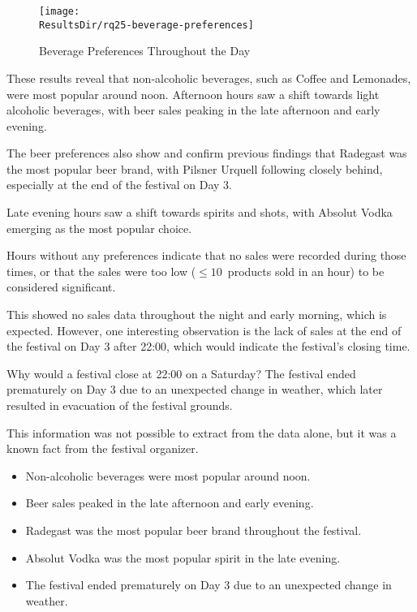 \begin{figure}[H]
	\centering
	\texttt{[image: \\ResultsDir/rq25-beverage-preferences]}
	\caption{Beverage Preferences Throughout the Day}
	\label{fig:beverage-preferences}
	\source
\end{figure}

These results reveal that non-alcoholic beverages, such as Coffee and Lemonades, were most popular around noon.
Afternoon hours saw a shift towards light alcoholic beverages, with beer sales peaking in the late afternoon and early evening.

The beer preferences also show and confirm previous findings that Radegast was the most popular beer brand, with Pilsner Urquell following closely behind, especially at the end of the festival on Day 3.

Late evening hours saw a shift towards spirits and shots, with Absolut Vodka emerging as the most popular choice.

Hours without any preferences indicate that no sales were recorded during those times, or that the sales were too low (\(\leq 10\)~products sold in an hour) to be considered significant.

This showed no sales data throughout the night and early morning, which is expected.
However, one interesting observation is the lack of sales at the end of the festival on Day 3 after 22:00, which would indicate the festival's closing time.

\begin{infobox}{Why would a festival close at 22:00 on a Saturday?}
	The festival ended prematurely on Day 3 due to an unexpected change in weather, which later resulted in evacuation of the festival grounds.
\end{infobox}

This information was not possible to extract from the data alone, but it was a known fact from the festival organizer.

\begin{keytakeaways}
	\begin{itemize}
		\item Non-alcoholic beverages were most popular around noon.
		\item Beer sales peaked in the late afternoon and early evening.
		\item Radegast was the most popular beer brand throughout the festival.
		\item Absolut Vodka was the most popular spirit in the late evening.
		\item The festival ended prematurely on Day 3 due to an unexpected change in weather.
	\end{itemize}
\end{keytakeaways}

